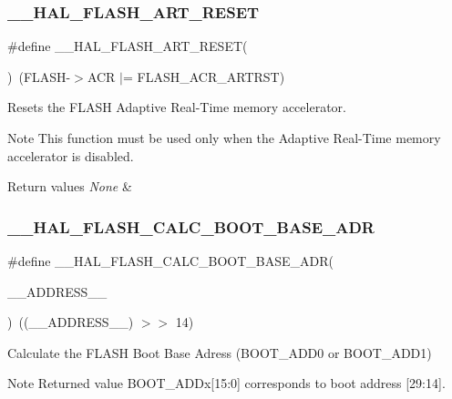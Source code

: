 \subsubsection{\texorpdfstring{\_\_HAL\_FLASH\_ART\_RESET}{\_\_HAL\_FLASH\_ART\_RESET}}
{\footnotesize\ttfamily \#define \+\_\+\+\_\+\+H\+A\+L\+\_\+\+F\+L\+A\+S\+H\+\_\+\+A\+R\+T\+\_\+\+R\+E\+S\+ET(\begin{DoxyParamCaption}{ }\end{DoxyParamCaption})~(F\+L\+A\+SH-\/$>$A\+CR $\vert$= F\+L\+A\+S\+H\+\_\+\+A\+C\+R\+\_\+\+A\+R\+T\+R\+ST)}



Resets the F\+L\+A\+SH Adaptive Real-\/\+Time memory accelerator. 

\begin{DoxyNote}{Note}
This function must be used only when the Adaptive Real-\/\+Time memory accelerator is disabled. 
\end{DoxyNote}

\begin{DoxyRetVals}{Return values}
{\em None} & \\
\hline
\end{DoxyRetVals}
\mbox{\label{group___f_l_a_s_h___exported___macros_gab7c736ccacb9f3eb5dd1f0c4d79e9a33}} 
\subsubsection{\texorpdfstring{\_\_HAL\_FLASH\_CALC\_BOOT\_BASE\_ADR}{\_\_HAL\_FLASH\_CALC\_BOOT\_BASE\_ADR}}
{\footnotesize\ttfamily \#define \+\_\+\+\_\+\+H\+A\+L\+\_\+\+F\+L\+A\+S\+H\+\_\+\+C\+A\+L\+C\+\_\+\+B\+O\+O\+T\+\_\+\+B\+A\+S\+E\+\_\+\+A\+DR(\begin{DoxyParamCaption}\item[{}]{\+\_\+\+\_\+\+A\+D\+D\+R\+E\+S\+S\+\_\+\+\_\+ }\end{DoxyParamCaption})~((\+\_\+\+\_\+\+A\+D\+D\+R\+E\+S\+S\+\_\+\+\_\+) $>$$>$ 14)}



Calculate the F\+L\+A\+SH Boot Base Adress (B\+O\+O\+T\+\_\+\+A\+D\+D0 or B\+O\+O\+T\+\_\+\+A\+D\+D1) 

\begin{DoxyNote}{Note}
Returned value B\+O\+O\+T\+\_\+\+A\+D\+Dx\mbox{[}15\+:0\mbox{]} corresponds to boot address \mbox{[}29\+:14\mbox{]}. 
\end{DoxyNote}

